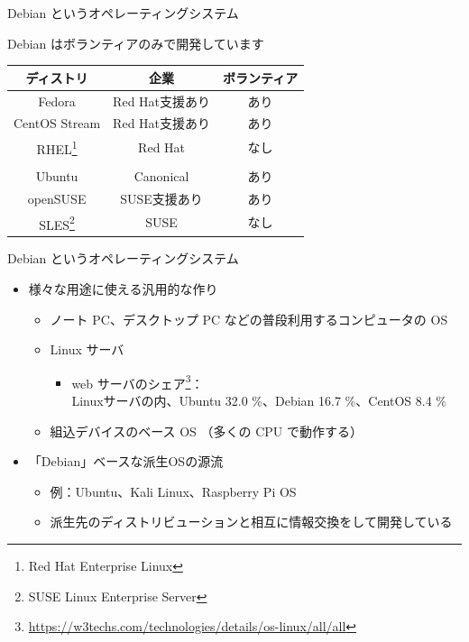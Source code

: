 \begin{frame}{Debian というオペレーティングシステム}

Debian はボランティアのみで開発しています

\begin{table}[htb]
  \begin{tabular}{|c|c|c|}
    \hline
    \textbf{ディストリ} & \textbf{企業}& \textbf{ボランティア} \\ \hline
    Fedora & Red Hat支援あり & あり  \\ \hline
    CentOS Stream & Red Hat支援あり & あり \\ \hline
    RHEL\footnote{Red Hat Enterprise Linux} & Red Hat & なし  \\ \hline
    \color{red}{Debian}  & \color{red}{なし} & \color{red}{あり} \\ \hline
    Ubuntu  & Canonical & あり \\ \hline
    openSUSE & SUSE支援あり & あり \\ \hline
    SLES\footnote{SUSE Linux Enterprise Server} & SUSE & なし \\ \hline
  \end{tabular}
\end{table}

\end{frame}

\begin{frame}{Debian というオペレーティングシステム}

\begin{itemize}
\item 様々な用途に使える汎用的な作り
  \begin{itemize}
  \item ノート PC、デスクトップ PC などの普段利用するコンピュータの OS
  \item Linux サーバ
    \begin{itemize}
    \item web サーバのシェア\footnote{\url{https://w3techs.com/technologies/details/os-linux/all/all}}：\\ Linuxサーバの内、Ubuntu 32.0 \%、Debian 16.7 \%、CentOS 8.4 \%
    \end{itemize}
  \item 組込デバイスのベース OS （多くの CPU で動作する）
  \end{itemize}
\item 「Debian」ベースな派生OSの源流
  \begin{itemize}
  \item 例：Ubuntu、Kali Linux、Raspberry Pi OS
  \item 派生先のディストリビューションと相互に情報交換をして開発している
  \end{itemize}
\end{itemize}

\end{frame}


